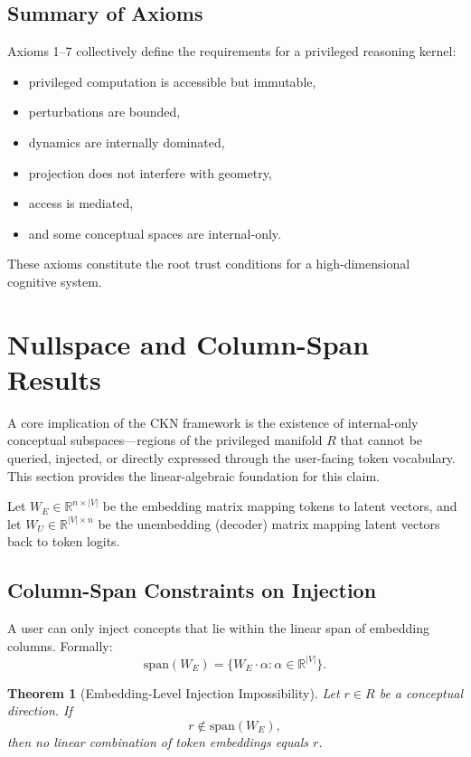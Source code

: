 \documentclass[11pt,a4paper]{article}
\newtheorem{theorem}{Theorem}[section]
\begin{document}
\subsection{Summary of Axioms}

Axioms 1--7 collectively define the requirements for a privileged reasoning kernel:
\begin{itemize}
    \item privileged computation is accessible but immutable,
    \item perturbations are bounded,
    \item dynamics are internally dominated,
    \item projection does not interfere with geometry,
    \item access is mediated,
    \item and some conceptual spaces are internal-only.
\end{itemize}

These axioms constitute the root trust conditions for a high-dimensional cognitive system.

\section{Nullspace and Column-Span Results}

A core implication of the CKN framework is the existence of internal-only conceptual subspaces---regions of the privileged manifold $R$ that cannot be queried, injected, or directly expressed through the user-facing token vocabulary. This section provides the linear-algebraic foundation for this claim.

Let $W_E \in \mathbb{R}^{n \times |V|}$ be the embedding matrix mapping tokens to latent vectors, and let $W_U \in \mathbb{R}^{|V| \times n}$ be the unembedding (decoder) matrix mapping latent vectors back to token logits.

\subsection{Column-Span Constraints on Injection}

A user can only inject concepts that lie within the linear span of embedding columns. Formally:
\[
\text{span}(W_E) = \{W_E \cdot \alpha : \alpha \in \mathbb{R}^{|V|}\}.
\]

\begin{theorem}[Embedding-Level Injection Impossibility]
\label{thm:injection}
Let $r \in R$ be a conceptual direction. If
\begin{equation}
r \notin \text{span}(W_E),
\end{equation}
then no linear combination of token embeddings equals $r$.
\end{theorem}
\end{document}
